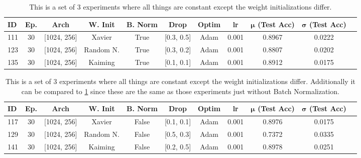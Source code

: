\documentclass[10pt]{amsart}
\begin{document}
\begin{table}[h]
    \centering
    \begin{tabular}{|l|c|c|c|c|c|c|c|c|c|c|} %
        \hline
        \textbf{ID} & \textbf{Ep.}
        & \textbf{Arch} & \textbf{W. Init}
        & \textbf{B. Norm} & \textbf{Drop}
        & \textbf{Optim} & \textbf{lr}
	& \textbf{$\bm \mu$ (Test Acc)}
        & \textbf{$\bm \sigma$ (Test Acc)} \\ 
        \hline
        111 & 30 & [1024, 256]  & Xavier 		& True & [0.3, 0.5] & Adam & 0.001 & 0.8967 & 0.0222 \\
        \hline
        123 & 30 & [1024, 256]  & Random N. 	& True & [0.3, 0.2] & Adam & 0.001 & 0.8807 & 0.0202 \\
        \hline
        135 & 30 & [1024, 256]  & Kaiming 		& True & [0.1, 0.1] & Adam & 0.001 & 0.8912 & 0.0175 \\  
        \hline
    \end{tabular}
    \caption{This is a set of 3 experiments where all things are constant except the weight initializations differ.}
    \label{tab:tab0}
\end{table}

\begin{table}[h]
    \centering
    \begin{tabular}{|l|c|c|c|c|c|c|c|c|c|c|} %
        \hline
        \textbf{ID} & \textbf{Ep.}
        & \textbf{Arch} & \textbf{W. Init}
        & \textbf{B. Norm} & \textbf{Drop}
        & \textbf{Optim} & \textbf{lr}
	& \textbf{$\bm \mu$ (Test Acc)}
        & \textbf{$\bm \sigma$ (Test Acc)} \\ 
        \hline
        117 & 30 & [1024, 256]  & Xavier 		& False & [0.1, 0.1] & Adam & 0.001 & 0.8976 & 0.0175 \\
        \hline
        129 & 30 & [1024, 256]  & Random N. 	& False & [0.5, 0.3] & Adam & 0.001 & 0.7372 & 0.0335 \\
        \hline
        141 & 30 & [1024, 256]  & Kaiming 		& False & [0.2, 0.5] & Adam & 0.001 & 0.8978 & 0.0251 \\  
        \hline
    \end{tabular}
    \caption{This is a set of 3 experiments where all things are constant except the weight initializations differ.
    Additionally it can be compared to \ref{tab:tab0} since these are the same as those experiments just without Batch Normalization.}
    \label{tab:tab1}
\end{table}
\end{document}
